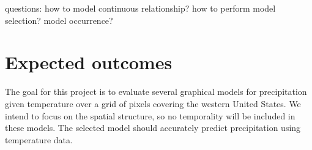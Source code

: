 \documentclass[twoside,11pt]{article}
\theoremstyle{definition}
\begin{document}
questions:
how to model continuous relationship?
how to perform model selection?
model occurrence?

\section*{Expected outcomes}
The goal for this project is to evaluate several graphical models for precipitation given temperature over a grid of pixels covering the western United States. We intend to focus on the spatial structure, so no temporality will be included in these models. The selected model should accurately predict precipitation using temperature data.
\end{document}
